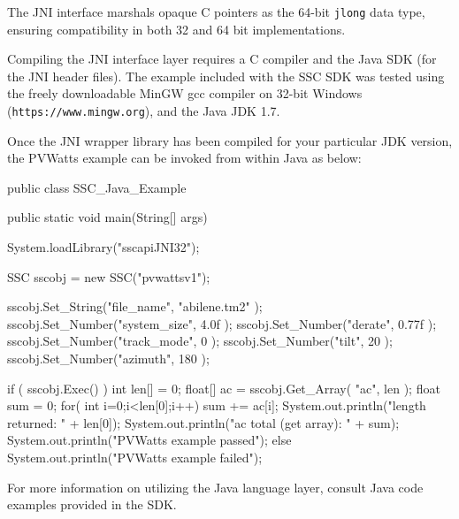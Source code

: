 \documentclass{article}
\begin{document}
The JNI interface marshals opaque C pointers as the 64-bit \texttt{jlong} data type, ensuring compatibility in both 32 and 64 bit implementations.

Compiling the JNI interface layer requires a C compiler and the Java SDK (for the JNI header files).  The example included with the SSC SDK was tested using the freely downloadable MinGW gcc compiler on 32-bit Windows (\texttt{https://www.mingw.org}), and the Java JDK 1.7.  

Once the JNI wrapper library has been compiled for your particular JDK version, the PVWatts example can be invoked from within Java as below:

\begin{verbatimtab}[4]

public class SSC_Java_Example {
   
    public static void main(String[] args)
    {
        System.loadLibrary("sscapiJNI32");
		
        SSC sscobj = new SSC("pvwattsv1");

        sscobj.Set_String("file_name", "abilene.tm2" );
        sscobj.Set_Number("system_size", 4.0f );
        sscobj.Set_Number("derate", 0.77f );
        sscobj.Set_Number("track_mode", 0 );
        sscobj.Set_Number("tilt", 20 );
        sscobj.Set_Number("azimuth", 180 );
        
		if ( sscobj.Exec() )
        {
            int len[] = {0};
            float[] ac = sscobj.Get_Array( "ac", len );
            float sum = 0;
            for( int i=0;i<len[0];i++)
            {
                sum += ac[i];
            }
            System.out.println("length returned: " + len[0]);
            System.out.println("ac total (get array): " + sum);
            System.out.println("PVWatts example passed");
        }
        else
        {
            System.out.println("PVWatts example failed");
        }
    }    
}

\end{verbatimtab}

For more information on utilizing the Java language layer, consult Java code examples provided in the SDK.


%
\end{document}
